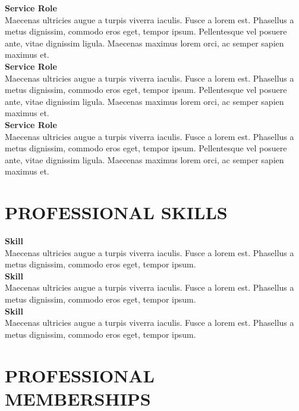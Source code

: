 \documentclass{article}
\begin{document}
\noindent
\newline
\textbf{Service Role} \\
Maecenas ultricies augue a turpis viverra iaculis. Fusce a lorem est. Phasellus a metus dignissim, commodo eros eget, tempor ipsum. Pellentesque vel posuere ante, vitae dignissim ligula. Maecenas maximus lorem orci, ac semper sapien maximus et. \\

\noindent
\textbf{Service Role} \\
Maecenas ultricies augue a turpis viverra iaculis. Fusce a lorem est. Phasellus a metus dignissim, commodo eros eget, tempor ipsum. Pellentesque vel posuere ante, vitae dignissim ligula. Maecenas maximus lorem orci, ac semper sapien maximus et. \\

\noindent
\textbf{Service Role} \\
Maecenas ultricies augue a turpis viverra iaculis. Fusce a lorem est. Phasellus a metus dignissim, commodo eros eget, tempor ipsum. Pellentesque vel posuere ante, vitae dignissim ligula. Maecenas maximus lorem orci, ac semper sapien maximus et. 


\section*{PROFESSIONAL SKILLS}

\noindent
\newline
\textbf{Skill} \\
Maecenas ultricies augue a turpis viverra iaculis. Fusce a lorem est. Phasellus a metus dignissim, commodo eros eget, tempor ipsum.  \\

\noindent
\textbf{Skill} \\
Maecenas ultricies augue a turpis viverra iaculis. Fusce a lorem est. Phasellus a metus dignissim, commodo eros eget, tempor ipsum.  \\

\noindent
\textbf{Skill} \\
Maecenas ultricies augue a turpis viverra iaculis. Fusce a lorem est. Phasellus a metus dignissim, commodo eros eget, tempor ipsum.  


\section*{PROFESSIONAL MEMBERSHIPS}
\end{document}
